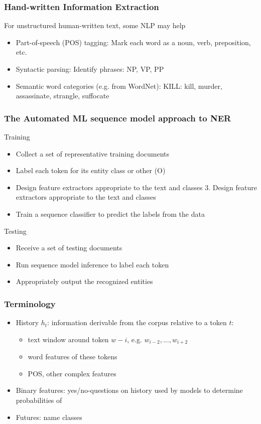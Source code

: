 \begin{frame}[fragile]\frametitle{Hand-written Information Extraction}
For unstructured human-written text, some NLP may help
  \begin{itemize}
  \item Part-of-speech (POS) tagging: Mark each word as a noun, verb, preposition, etc.
  \item Syntactic parsing: Identify phrases: NP, VP, PP
  \item Semantic word categories (e.g. from WordNet): KILL: kill, murder, assassinate, strangle, suffocate
  \end{itemize}
\end{frame}





\begin{frame}[fragile]\frametitle{The Automated ML sequence model approach to NER}
Training
  \begin{itemize}
  \item  Collect a set of representative training documents
  \item  Label each token for its entity class or other (O)
  \item  Design feature extractors appropriate to the text and classes 3. Design feature extractors appropriate to the text and classes
  \item  Train a sequence classifier to predict the labels from the data
  \end{itemize}
Testing  
  \begin{itemize}
  \item  Receive a set of testing documents
  \item  Run sequence model inference to label each token
  \item  Appropriately output the recognized entities
  \end{itemize}
\end{frame}

\begin{frame}[fragile]\frametitle{Terminology}
  \begin{itemize}
  \item History $h_t$: information derivable from the corpus relative to a token $t$:
    \begin{itemize}
  \item text window around token $w-i$, e.g. $w_{i-2},\ldots,w_{i+2}$
  \item word features of these tokens
  \item POS, other complex features
    \end{itemize}
  \item Binary features: yes/no-questions on history used by models to determine probabilities of
  \item Futures: name classes

  \end{itemize}
\end{frame}

